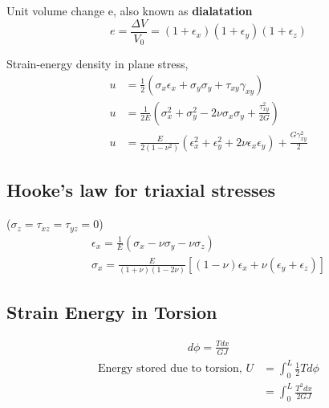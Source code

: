 \documentclass{article}
\begin{document}
		Unit volume change e, also known as \textbf{dialatation}\\
		\[e=\frac{\Delta V}{V_0} = (1+\epsilon_x) (1+\epsilon_y)  (1+\epsilon_z)\]

		Strain-energy density in plane stress,
		\begin{align*}
			u &= \frac{1}{2}(\sigma_x\epsilon_x + \sigma_y \sigma_y + \tau_{xy} \gamma_{xy})\\
			u &= \frac{1}{2E} (\sigma_x^2 +\sigma_y^2 - 2 \nu \sigma_x \sigma_y +\frac{\tau_{xy}^2}{2G})\\
			u &= \frac{E}{2(1-\nu^2)}(\epsilon_x^2 +\epsilon_y^2 +2\nu\epsilon_x \epsilon_y)+\frac{G\gamma_{xy}^2}{2}
		\end{align*}
	\subsection{Hooke's law for triaxial stresses}
	($\sigma_z=\tau_{xz}=\tau_{yz}=0$)
	\begin{gather*}
		\epsilon_x = \frac{1}{E}(\sigma_x -\nu \sigma_y -\nu \sigma_z)\\
		\sigma_x = \frac{E}{(1+\nu)(1-2\nu)}[(1-\nu)\epsilon_x + \nu (\epsilon_y+\epsilon_z)]
	\end{gather*}


	\subsection{Strain Energy in Torsion}
	\begin{gather*}
		d\phi = \frac{T dx}{GJ}
	\end{gather*}
	\begin{align*}
		\text{Energy stored due to torsion, } U &= \int_0^L \frac{1}{2} T d\phi\\
											    &= \int_0^L \frac{T^2 dx}{2GJ} \\
	\end{align*}
\end{document}
